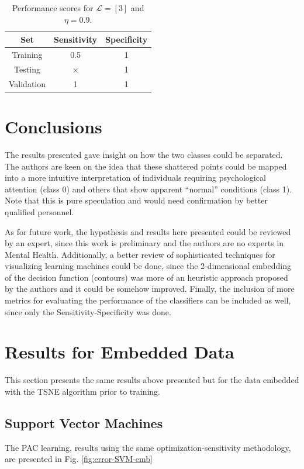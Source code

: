 \documentclass[conference]{IEEEtran}
\theoremstyle{definition}
\theoremstyle{remark}
\theoremstyle{remark}
\begin{document}
\begin{table}
  \centering
  \caption{Performance scores for $\mathcal{L}=[3]$ and $\eta=0.9$.}
  \label{tab:L3}
  \begin{tabular}{ccc}
    \hline
    \textbf{Set} & \textbf{Sensitivity} & \textbf{Specificity} \\ \hline
    Training & 0.5 & 1 \\
    Testing & $\times$ & 1 \\
    Validation & 1 & 1 \\ \hline
  \end{tabular}
\end{table}

\section{Conclusions}\label{sec:conc}
The results presented gave insight on how the two classes could be separated.
The authors are keen on the idea that these shattered points could be mapped
into a more intuitive interpretation of individuals requiring psychological
attention (class 0) and others that show apparent ``normal'' conditions (class
1). Note that this is pure speculation and would need confirmation by better
qualified personnel.

As for future work, the hypothesis and results here presented could be reviewed
by an expert, since this work is preliminary and the authors are no experts in
Mental Health. Additionally, a better review of sophisticated techniques for
visualizing learning machines could be done, since the 2-dimensional embedding
of the decision function (contours) was more of an heuristic approach proposed
by the authors and it could be somehow improved. Finally, the inclusion of more
metrics for evaluating the performance of the classifiers can be included as
well, since only the Sensitivity-Specificity was done.

\printbibliography

\newpage
\appendices

\section{Results for Embedded Data}\label{app:emb}
This section presents the same results above presented but for the data
embedded with the TSNE algorithm prior to training.

\subsection{Support Vector Machines}
The PAC learning, results using the same optimization-sensitivity methodology,
are presented in Fig. \ref{fig:error-SVM-emb}
\end{document}
